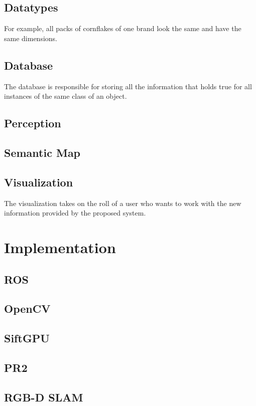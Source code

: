 \documentclass[11pt, twoside, a4paper]{report}
\begin{document}
\newpage
\subsection{Datatypes}
For example, all packs of cornflakes of one brand look the same and have the same dimensions.

\subsection{Database}
The database is responsible for storing all the information that holds true for all instances of the same class of an object. 

\subsection{Perception} %


\subsection{Semantic Map}


\subsection{Visualization}
The visualization takes on the roll of a user who wants to work with the new information provided by the proposed system. 


\newpage
\section{Implementation}
\subsection{ROS}
\subsection{OpenCV}
\subsection{SiftGPU}
\subsection{PR2}
\subsection{RGB-D SLAM}
\end{document}
